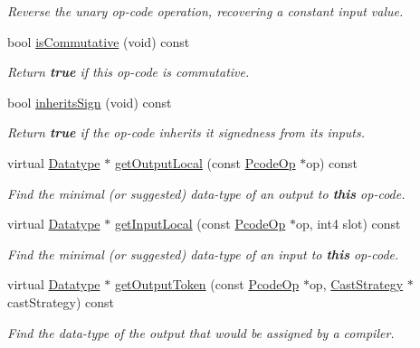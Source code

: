 \begin{DoxyCompactItemize}
\begin{DoxyCompactList}\small\item\em Reverse the unary op-\/code operation, recovering a constant input value. \end{DoxyCompactList}\item 
bool \mbox{\hyperlink{class_type_op_a2d51c10873a61d54a5c4c30221f5706e}{is\+Commutative}} (void) const
\begin{DoxyCompactList}\small\item\em Return {\bfseries{true}} if this op-\/code is commutative. \end{DoxyCompactList}\item 
bool \mbox{\hyperlink{class_type_op_a8440bbfcbdd6209b625048ee20db29c9}{inherits\+Sign}} (void) const
\begin{DoxyCompactList}\small\item\em Return {\bfseries{true}} if the op-\/code inherits it signedness from its inputs. \end{DoxyCompactList}\item 
virtual \mbox{\hyperlink{class_datatype}{Datatype}} $\ast$ \mbox{\hyperlink{class_type_op_a3454cadfb15f6794829123a7ecfe38f5}{get\+Output\+Local}} (const \mbox{\hyperlink{class_pcode_op}{Pcode\+Op}} $\ast$op) const
\begin{DoxyCompactList}\small\item\em Find the minimal (or suggested) data-\/type of an output to {\bfseries{this}} op-\/code. \end{DoxyCompactList}\item 
virtual \mbox{\hyperlink{class_datatype}{Datatype}} $\ast$ \mbox{\hyperlink{class_type_op_abe2e4b619932cf94bafb084963a0fc66}{get\+Input\+Local}} (const \mbox{\hyperlink{class_pcode_op}{Pcode\+Op}} $\ast$op, int4 slot) const
\begin{DoxyCompactList}\small\item\em Find the minimal (or suggested) data-\/type of an input to {\bfseries{this}} op-\/code. \end{DoxyCompactList}\item 
virtual \mbox{\hyperlink{class_datatype}{Datatype}} $\ast$ \mbox{\hyperlink{class_type_op_a7150ac93bb03a993735c829deb5237e7}{get\+Output\+Token}} (const \mbox{\hyperlink{class_pcode_op}{Pcode\+Op}} $\ast$op, \mbox{\hyperlink{class_cast_strategy}{Cast\+Strategy}} $\ast$cast\+Strategy) const
\begin{DoxyCompactList}\small\item\em Find the data-\/type of the output that would be assigned by a compiler. \end{DoxyCompactList}\item 

\end{DoxyCompactItemize}
